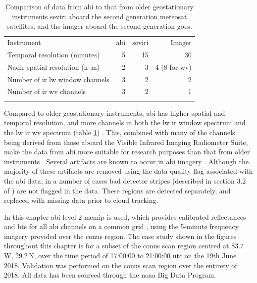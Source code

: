 \begin{table}[tb]
\centering
\begin{tabular}{lrrr}
\tophline
Instrument                                              & \acrshort{abi}   & \acrshort{seviri}    & Imager \\
\middlehline
Temporal resolution (\unit{minutes})                    & 5     & 15        & 30 \\
Nadir spatial resolution (\unit{k m})                   & 2     & 3         & 4 (8 for \acrshort{wv}) \\
Number of \acrshort{ir} \acrshort{lw} window channels                         & 3     & 2         & 2 \\
Number of \acrshort{ir} \acrshort{wv} channels                                & 3     & 2         & 1 \\
\bottomhline
\end{tabular}
\caption[
Comparison of data from \acrshort{abi} to that from older geostationary instruments
]{
Comparison of data from \acrshort{abi} to that from older geostationary instruments\; \acrshort{seviri} aboard the second generation meteosat satellites, and the imager aboard the second generation \acrshort{goes}.
} %
\label{table:abi_comparison}
\end{table}

Compared to older geostationary instruments, \acrshort{abi} has higher spatial and temporal resolution, and more channels in both the \acrshort{lw} \acrshort{ir} window spectrum and the \acrshort{lw} \acrshort{ir} \acrfull{wv} spectrum (table \ref{table:abi_comparison}) \citep{iacovazzi_goes-16_2020}.
This, combined with many of the channels being derived from those aboard the Visible Infrared Imaging Radiometer Suite, make the data from \acrshort{abi} more suitable for research purposes than that from older instruments \citep{heidinger_chapter_2020}.
Several artifacts are known to occur in \acrshort{abi} imagery \citep{gunshor_goes-r_2020}.
Although the majority of these artifacts are removed using the data quality flag associated with the \acrshort{abi} data, in a number of cases bad detector stripes (described in section 3.2 of \citealp{gunshor_goes-r_2020}) are not flagged in the data. 
These regions are detected separately, and replaced with missing data prior to cloud tracking.

In this chapter  \acrshort{abi} level 2 \acrfull{mcmip} is used, which provides calibrated reflectances and \acrshort{bt}s for all \acrshort{abi} channels on a common grid \citep{schmit_chapter_2020}, using the 5-minute frequency imagery provided over the \acrshort{conus} region.
The case study shown in the figures throughout this chapter is for a subset of the \acrshort{conus} scan region centred at 83.7\,\textdegree W, 29.2\,\textdegree N, over the time period of 17:00:00 to 21:00:00 \acrshort{utc} on the 19th June 2018.
Validation was performed on the \acrshort{conus} scan region over the entirety of 2018.
All data has been sourced through the \acrshort{noaa} Big Data Program.



